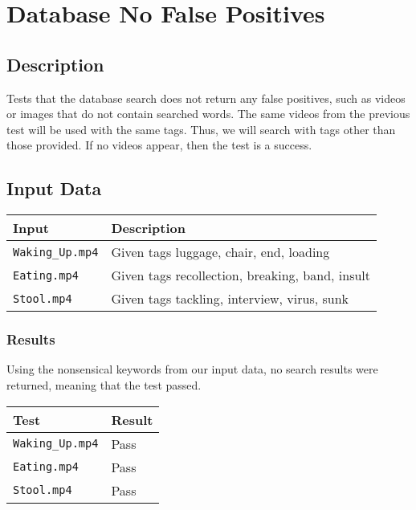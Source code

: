 \documentclass{scrreprt}
\begin{document}
\section{Database No False Positives}
\subsection{Description}

Tests that the database search does not return any false positives, such as
videos or images that do not contain searched words. The same videos from the
previous test will be used with the same tags. Thus, we will search with tags
other than those provided. If no videos appear, then the test is a success.

\subsection{Input Data}

\begin{table}[H]
        \centering
        \begin{tabular}{p{3cm}p{6cm}}
                \hline\hline
                Input & Description\\
                \hline\hline
                \verb|Waking_Up.mp4| &  Given tags luggage, chair, end, loading\\
                \hline
                \verb|Eating.mp4| &  Given tags recollection, breaking, band, insult\\
                \hline
                \verb|Stool.mp4| &  Given tags tackling, interview, virus, sunk\\
                \hline
        \end{tabular}
\end{table}

\subsubsection{Results}

Using the nonsensical keywords from our input data, no search results were
returned, meaning that the test passed.

\begin{table}[H]
        \centering
        \begin{tabular}{||p{2.5cm}|p{2.5cm}||}
                \hline
                \textbf Test & \textbf Result\\
                \hline\hline
                \verb|Waking_Up.mp4| &  Pass \\
                \hline
                \verb|Eating.mp4| &  Pass\\
                \hline
                \verb|Stool.mp4| &  Pass\\
                \hline
        \end{tabular}
\end{table}
\end{document}

